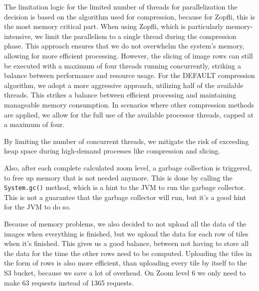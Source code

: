 The limitation logic for the limited number of threads for parallelization the decision is based on the algorithm used for compression, because for Zopfli, this is the most memory critical part. When using Zopfli, which is particularly memory-intensive, we limit the parallelism to a single thread during the compression phase. This approach ensures that we do not overwhelm the system's memory, allowing for more efficient processing. However, the slicing of image rows can still be executed with a maximum of four threads running concurrently, striking a balance between performance and resource usage. For the DEFAULT compression algorithm, we adopt a more aggressive approach, utilizing half of the available threads. This strikes a balance between efficient processing and maintaining manageable memory consumption. In scenarios where other compression methods are applied, we allow for the full use of the available processor threads, capped at a maximum of four.

By limiting the number of concurrent threads, we mitigate the risk of exceeding heap space during high-demand processes like compression and slicing.

Also, after each complete calculated zoom level, a garbage collection is triggered, to free up memory that is not needed anymore. This is done by calling the \texttt{System.gc()} method, which is a hint to the JVM to run the garbage collector. This is not a guarantee that the garbage collector will run, but it's a good hint for the JVM to do so.

Because of memory problems, we also decided to not upload all the data of the images when everything is finished, but we upload the data for each row of tiles when it's finished. This gives us a good balance, between not having to store all the data for the time the other rows need to be computed. Uploading the tiles in the form of rows is also more efficient, than uploading every tile by itself to the S3 bucket, because we save a lot of overhead. On Zoom level 6 we only need to make 63 requests instead of 1365 requests.
